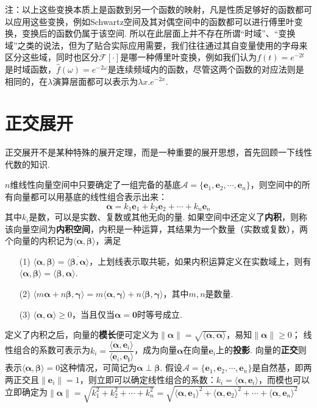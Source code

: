\documentclass[main.tex]{subfiles}
\begin{document}
注：以上这些变换本质上是函数到另一个函数的映射，凡是性质足够好的函数都可以应用这些变换，例如Schwartz空间及其对偶空间中的函数都可以进行傅里叶变换，变换后的函数仍属于该空间. 所以在此层面上并不存在所谓“时域”、“变换域”之类的说法，但为了贴合实际应用需要，我们往往通过其自变量使用的字母来区分这些域，同时也区分\(\mathcal{F}[\cdot]\)是哪一种傅里叶变换，例如我们认为\(f(t)=e^{-2t}\)是时域函数，\(\hat{f}(\omega)=e^{-2\omega}\)是连续频域内的函数，尽管这两个函数的对应法则是相同的，在\(\lambda\)演算层面都可以表示为\(\lambda x. e^{-2x}\).

\section{正交展开}

正交展开不是某种特殊的展开定理，而是一种重要的展开思想，首先回顾一下线性代数的知识.

\begin{reference}
    \(n\)维线性向量空间中只要确定了一组完备的基底\(\mathcal{A} = \{\bm{e}_1, \bm{e}_2, \cdots, \bm{e}_n\}\)，则空间中的所有向量都可以用基底的线性组合表示出来：
    \[\bm{\alpha} = k_1\bm{e}_1+k_2\bm{e}_2+\cdots+k_n\bm{e}_n\]
    其中\(k_i\)是数，可以是实数、复数或其他无向的量.
    \newline
    如果空间中还定义了\textbf{内积}，则称该向量空间为\textbf{内积空间}，内积是一种运算，其结果为一个数量（实数或复数），两个向量的内积记为\(\langle \bm{\alpha},\bm{\beta} \rangle\)，满足
    \begin{itemize}
        \item [(1)] \(\langle \bm{\alpha},\bm{\beta} \rangle = \overline{\langle \bm{\beta},\bm{\alpha} \rangle}\)，上划线表示取共轭，如果内积运算定义在实数域上，则有\(\langle \bm{\alpha},\bm{\beta} \rangle = \langle \bm{\beta},\bm{\alpha} \rangle\).
        \item [(2)] \(\langle m\bm{\alpha}+n\bm{\beta},\bm{\gamma} \rangle = m\langle \bm{\alpha},\bm{\gamma} \rangle + n\langle \bm{\beta},\bm{\gamma} \rangle\)，其中\(m,n\)是数量.
        \item [(3)] \(\langle \bm{\alpha},\bm{\alpha} \rangle \geq 0\)，当且仅当\(\bm{\alpha}=\bm{0}\)时等号成立.
    \end{itemize}
    定义了内积之后，向量的\textbf{模长}便可定义为\(\|\bm{\alpha}\|=\sqrt{\langle \bm{\alpha},\bm{\alpha} \rangle}\)，易知\(\|\bm{\alpha}\| \geq 0\)；
    \newline
    线性组合的系数可表示为\(k_i=\dfrac{\langle \bm{\alpha}, \bm{e}_i \rangle}{\langle \bm{e}_i, \bm{e_i} \rangle}\)，成为向量\(\bm{\alpha}\)在向量\(\bm{e}_i\)上的\textbf{投影}.
    \newline
    向量的\textbf{正交}则表示\(\langle \bm{\alpha},\bm{\beta} \rangle=0\)这种情况，可简记为\(\bm{\alpha} \perp \bm{\beta}\).
    \newline
    假设\(\mathcal{A}=\{\bm{e}_1, \bm{e}_2, \cdots, \bm{e}_n\}\)是自然基，即两两正交且\(\|\bm{e}_i\|=1\)，则立即可以确定线性组合的系数：\(k_i = \langle\bm{\alpha},\bm{e}_i\rangle\)，而模也可以立即确定为\(\|\bm{\alpha}\| = \sqrt{k_1^2+k_2^2+\cdots+k_n^2} = \sqrt{\langle\bm{\alpha},\bm{e}_1\rangle^2+\langle\bm{\alpha},\bm{e}_2\rangle^2+\cdots+\langle\bm{\alpha},\bm{e}_n\rangle^2}\)
\end{reference}
\end{document}
